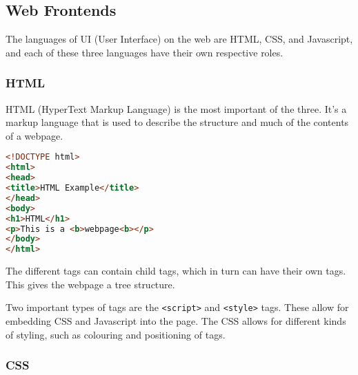 \subsection{Web Frontends} \label{sec:webfrontends}
The languages of UI (User Interface) on the web are HTML, CSS, and Javascript, and each of these three languages have their own respective roles.\cite{nixonweb}

\subsubsection*{HTML}

HTML (HyperText Markup Language) is the most important of the three.
It's a markup language that is used to describe the structure and much of the contents of a webpage.
\begin{lstlisting}[language=HTML,caption={\color{red}indsæt caption tekst},label=lst:HTML]
<!DOCTYPE html>
<html>
<head>
<title>HTML Example</title>
</head>
<body>
<h1>HTML</h1>
<p>This is a <b>webpage<b></p>
</body>
</html>
\end{lstlisting}
The different tags can contain child tags, which in turn can have their own tags.
This gives the webpage a tree structure.

Two important types of tags are the \texttt{<script>} and \texttt{<style>} tags.
These allow for embedding CSS and Javascript into the page.
The CSS allows for different kinds of styling, such as colouring and positioning of tags.

\subsubsection*{CSS}

